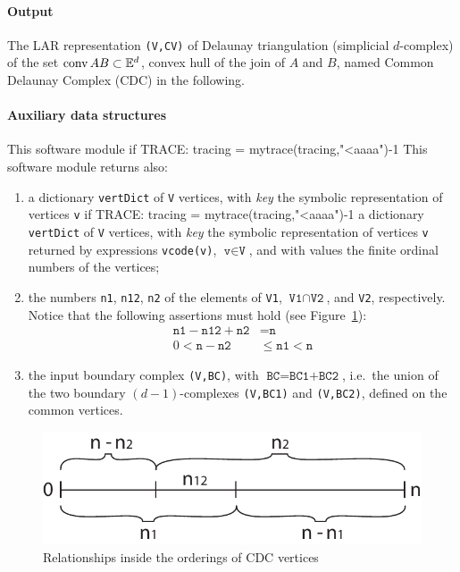 \documentclass[11pt,oneside]{article}	%
\def\conv{\mbox{\textrm{conv}\,}}
\def\E{\mathbb{E}}
\def\conv{\mbox{\rm conv}\,}
\begin{document}
\paragraph{Output} 
The LAR representation \texttt{(V,CV)} of Delaunay triangulation (simplicial $d$-complex) of the set $\conv AB \subset \E^d$, convex hull of the join of $A$ and $B$, named Common Delaunay Complex (CDC) in the following.

\paragraph{Auxiliary data structures} 

This software module if TRACE: tracing = mytrace(tracing,"<aaaa")-1
This software module returns also:

\begin{enumerate}
\item 

a dictionary \texttt{vertDict} of \texttt{V} vertices, with \emph{key} the symbolic representation of vertices \texttt{v} if TRACE: tracing = mytrace(tracing,"<aaaa")-1
a dictionary \texttt{vertDict} of \texttt{V} vertices, with \emph{key} the symbolic representation of vertices \texttt{v} returned by expressions \texttt{vcode(v)}, $\texttt{v}\in \texttt{V}$, and with values the finite ordinal numbers of the vertices;

\item 
the numbers \texttt{n1}, \texttt{n12}, \texttt{n2} of the elements of \texttt{V1}, $\texttt{V1}\cap\texttt{V2}$, and \texttt{V2}, respectively. Notice that the following assertions must hold (see Figure~\ref{fig:bounds}):
\begin{align}
\texttt{n1} - \texttt{n12} + \texttt{n2} &= \texttt{n} \\
0 < \texttt{n} - \texttt{n2}  &\leq  \texttt{n1}  <  \texttt{n} 
\end{align}

\item the input boundary complex \texttt{(V,BC)}, with $\texttt{BC} = \texttt{BC1+BC2}$, i.e.~the union of the  two boundary $(d-1)$-complexes \texttt{(V,BC1)} and \texttt{(V,BC2)}, defined on the common vertices.
\end{enumerate}

\begin{figure}[htbp] %
   \centering
   \includegraphics[width=0.5\linewidth]{images/bounds} 
   \caption{Relationships inside the orderings of CDC vertices}
   \label{fig:bounds}
\end{figure}
\end{document}
